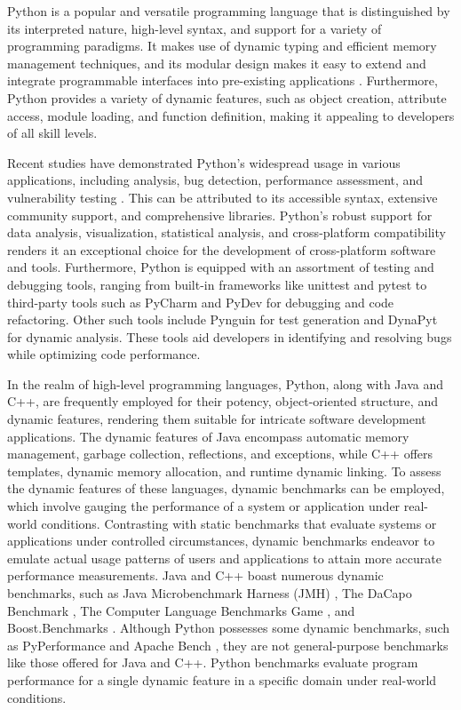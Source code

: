 Python is a popular and versatile programming language that is distinguished by its interpreted nature, high-level syntax, and support for a variety of programming paradigms.
It makes use of dynamic typing and efficient memory management techniques, and its modular design makes it easy to extend and integrate programmable interfaces into pre-existing applications \cite{Python_language_wiki}.
Furthermore, Python provides a variety of dynamic features, such as object creation, attribute access, module loading, and function definition, making it appealing to developers of all skill levels. 

Recent studies have demonstrated Python's widespread usage in various applications, including analysis, bug detection, performance assessment, and vulnerability testing \cite{Python_usage_study1, Python_usage_study2}. This can be attributed to its accessible syntax, extensive community support, and comprehensive libraries. Python's robust support for data analysis, visualization, statistical analysis, and cross-platform compatibility renders it an exceptional choice for the development of cross-platform software and tools. Furthermore, Python is equipped with an assortment of testing and debugging tools, ranging from built-in frameworks like unittest and pytest to third-party tools such as PyCharm \cite{PyCharm_2023} and PyDev \cite{PyDev_2023} for debugging and code refactoring. Other such tools include Pynguin for test generation and DynaPyt for dynamic analysis. These tools aid developers in identifying and resolving bugs while optimizing code performance.

In the realm of high-level programming languages, Python, along with Java and C++, are frequently employed for their potency, object-oriented structure, and dynamic features, rendering them suitable for intricate software development applications. The dynamic features of Java encompass automatic memory management, garbage collection, reflections, and exceptions, while C++ offers templates, dynamic memory allocation, and runtime dynamic linking. To assess the dynamic features of these languages, dynamic benchmarks can be employed, which involve gauging the performance of a system or application under real-world conditions. Contrasting with static benchmarks that evaluate systems or applications under controlled circumstances, dynamic benchmarks endeavor to emulate actual usage patterns of users and applications to attain more accurate performance measurements. Java and C++ boast numerous dynamic benchmarks, such as Java Microbenchmark Harness (JMH) \cite{JMH}, The DaCapo Benchmark \cite{DaCapo_2006}, The Computer Language Benchmarks Game \cite{C++_Benchmark1}, and Boost.Benchmarks \cite{Boost_Benchmarks}. Although Python possesses some dynamic benchmarks, such as PyPerformance \cite{PyPerformance} and Apache Bench \cite{Apache_Benchmark}, they are not general-purpose benchmarks like those offered for Java and C++. Python benchmarks evaluate program performance for a single dynamic feature in a specific domain under real-world conditions.

